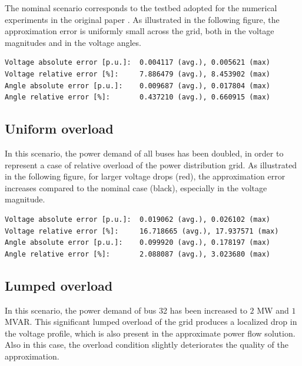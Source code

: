 \documentclass[10pt,letterpaper]{article}
\begin{document}
The nominal scenario corresponds to the testbed adopted for the numerical experiments in the original paper \cite{Bolognani_powerflow}. As illustrated in the following figure, the approximation error is uniformly small across the grid, both in the voltage magnitudes and in the voltage angles.

\begin{verbatim}
Voltage absolute error [p.u.]:  0.004117 (avg.), 0.005621 (max)
Voltage relative error [%]:     7.886479 (avg.), 8.453902 (max)
Angle absolute error [p.u.]:    0.009687 (avg.), 0.017804 (max)
Angle relative error [%]:       0.437210 (avg.), 0.660915 (max)
\end{verbatim}

\begin{figure}

\end{figure}

\subsection{Uniform overload}

In this scenario, the power demand of all buses has been doubled, in order to represent a case of relative overload of the power distribution grid. As illustrated in the following figure, for larger voltage drops (red), the approximation error increases compared to the nominal case (black), especially in the voltage magnitude.

\begin{verbatim}
Voltage absolute error [p.u.]:  0.019062 (avg.), 0.026102 (max)
Voltage relative error [%]:     16.718665 (avg.), 17.937571 (max)
Angle absolute error [p.u.]:    0.099920 (avg.), 0.178197 (max)
Angle relative error [%]:       2.088087 (avg.), 3.023680 (max)
\end{verbatim}

\def\octavedatam{data/data_2_voltagem.data}
\def\octavedataa{data/data_2_voltagea.data}


\subsection{Lumped overload}

In this scenario, the power demand of bus 32 has been increased to $2$ MW and $1$ MVAR. This significant lumped overload of the grid produces a localized drop in the voltage profile, which is also present in the approximate power flow solution. Also in this case, the overload condition slightly deteriorates the quality of the approximation.
\end{document}
